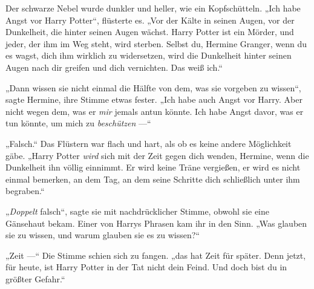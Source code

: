 Der schwarze Nebel wurde dunkler und heller, wie ein Kopfschütteln.
„Ich habe Angst vor Harry Potter“, flüsterte es.
„Vor der Kälte in seinen Augen, vor der Dunkelheit, die hinter seinen Augen wächst. Harry Potter ist ein Mörder, und jeder, der ihm im Weg steht, wird sterben. Selbst du, Hermine Granger, wenn du es wagst, dich ihm wirklich zu widersetzen, wird die Dunkelheit hinter seinen Augen nach dir greifen und dich vernichten. Das weiß ich.“

„Dann wissen sie nicht einmal die Hälfte von dem, was sie vorgeben zu wissen“, sagte Hermine, ihre Stimme etwas fester.
„Ich habe auch Angst vor Harry. Aber nicht wegen dem, was er \emph{mir} jemals antun könnte. Ich habe Angst davor, was er tun könnte, um mich zu \emph{beschützen} —“

„Falsch.“ Das Flüstern war flach und hart, als ob es keine andere Möglichkeit gäbe.
„Harry Potter \emph{wird} sich mit der Zeit gegen dich wenden, Hermine, wenn die Dunkelheit ihn völlig einnimmt. Er wird keine Träne vergießen, er wird es nicht einmal bemerken, an dem Tag, an dem seine Schritte dich schließlich unter ihm begraben.“

„\emph{Doppelt} falsch“, sagte sie mit nachdrücklicher Stimme, obwohl sie eine Gänsehaut bekam. Einer von Harrys Phrasen kam ihr in den Sinn.
„Was glauben sie zu wissen, und warum glauben sie es zu wissen?“

„Zeit —“ Die Stimme schien sich zu fangen. „das hat Zeit für später. Denn jetzt, für heute, ist Harry Potter in der Tat nicht dein Feind. Und doch bist du in größter Gefahr.“

